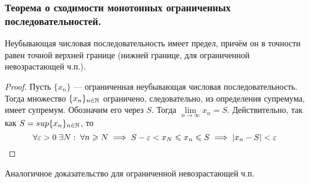 \documentclass[12pt, a4paper]{article}
\begin{document}
	\subsubsection{Теорема о сходимости монотонных ограниченных последовательностей.}
	\begin{theorem*}
		Неубывающая числовая последовательность имеет предел, причём он в точности равен точной верхней границе (нижней границе, для ограниченной невозрастающей ч.п.).
	\end{theorem*}
	\begin{proof}
		Пусть $\{x_n\}$ --- ограниченная неубывающая числовая последовательность. Тогда множество $\{x_n\}_{n \in \mathbb{N}}$ ограничено, следовательно, из определения супремума, имеет супремум. Обозначим его через $S$. Тогда $\lim\limits_{n \to \infty} x_n = S$. Действительно, так как $S = sup \{x_n\}_{n \in \mathbb{N}}$, то
		\begin{equation*}
			\forall \varepsilon > 0 \; \exists N: \; \forall n \geqslant N \implies S - \varepsilon < x_N \leqslant x_n \leqslant S \implies |x_n - S| < \varepsilon
		\end{equation*}
	\end{proof}
	Аналогичное доказательство для ограниченной невозрастающей ч.п.
\end{document}
